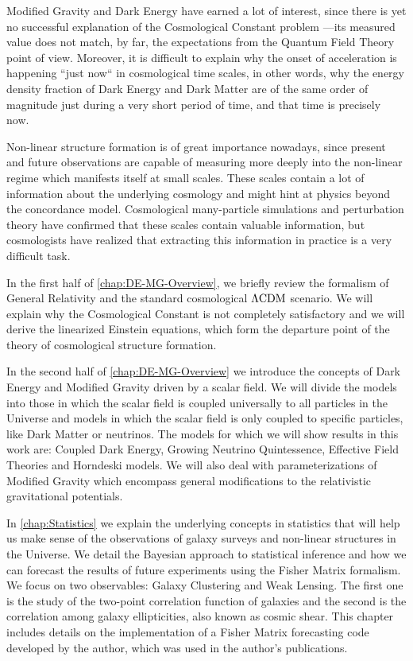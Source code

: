 Modified Gravity and Dark Energy have earned a lot of interest, since there is yet no successful explanation of the Cosmological Constant problem ---its measured value does not match, by far, the expectations from the Quantum Field Theory point of view. Moreover, it is difficult to explain why the onset of acceleration is happening ``just now`` in cosmological time scales, in other words, why the energy density fraction of Dark Energy and Dark Matter are of the same order of magnitude just during a very short period of time, and that time is precisely now.

Non-linear structure formation is of great importance nowadays, since present and future observations are capable of 
measuring more deeply into the non-linear regime which manifests itself at small scales. 
These scales contain a lot of information about the underlying cosmology and might hint at physics beyond the concordance model. Cosmological many-particle simulations and perturbation theory
have confirmed that these scales contain valuable information, 
but cosmologists have realized that extracting this information in practice is a very difficult task.

In the first half of \cref{chap:DE-MG-Overview}, 
we briefly review the formalism of General Relativity and
the standard cosmological $\Lambda\mathrm{CDM}$ scenario. We will explain why the Cosmological 
Constant is not completely satisfactory and we will derive the linearized
Einstein equations, which form the departure point of the theory of 
cosmological structure formation.

In the second half of \cref{chap:DE-MG-Overview} we introduce the concepts of Dark Energy 
and Modified Gravity driven by a scalar field. We will divide the models into those in which the
scalar field is coupled universally to all particles in the Universe and models in which the scalar field is only coupled to specific particles, like Dark Matter or neutrinos. The models for which we will show results in this work are: Coupled Dark Energy, Growing Neutrino Quintessence, Effective Field Theories and Horndeski models. 
We will also deal with parameterizations of Modified Gravity which encompass
general modifications to the relativistic gravitational potentials.

In \cref{chap:Statistics} we explain the underlying concepts in statistics that will help us
make sense of the observations of galaxy surveys and non-linear structures in the Universe.
We detail the Bayesian approach to statistical inference and how we can forecast the results of future 
experiments using the Fisher Matrix formalism. We focus on two observables: Galaxy Clustering
and Weak Lensing. The first one is the study of the two-point correlation function of galaxies
and the second is the correlation among galaxy ellipticities, also known as cosmic shear. 
This chapter includes details on the implementation
of a Fisher Matrix forecasting code developed by the author, which was used in the author's publications.

